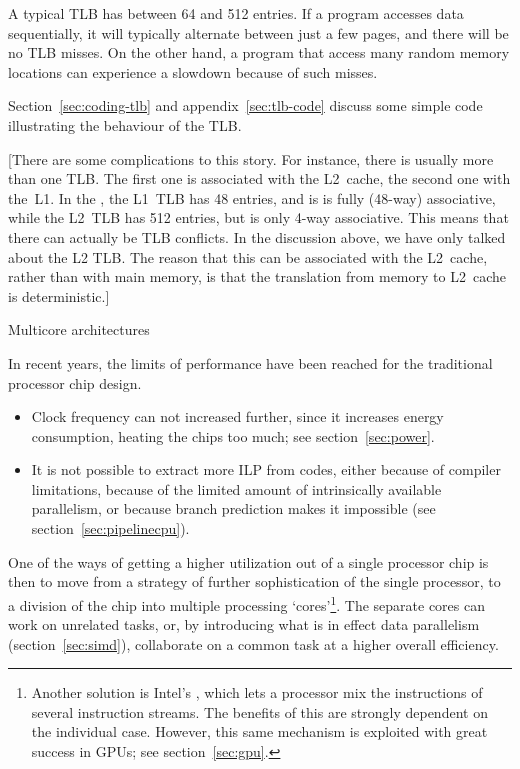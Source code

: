 A typical \ac{TLB} has between 64 and 512 entries. If a program accesses
data sequentially, it will typically alternate between just a few
pages, and there will be no \ac{TLB} misses. On the other hand, a program
that access many random memory locations can experience a slowdown
because of such misses. 

Section~\ref{sec:coding-tlb} and appendix~\ref{sec:tlb-code} discuss
some simple code illustrating the
behaviour of the \ac{TLB}.

[There are some complications to this story. For instance, there is
  usually more than one \ac{TLB}. The first one is associated with the
  L2~cache, the second one with the~L1. In the
  , the L1~\ac{TLB} has 48 entries, and
  is is fully (48-way) associative, while the L2~\ac{TLB} has 512
  entries, but is only 4-way associative. This means that there can
  actually be \ac{TLB} conflicts. In the discussion above, we have
  only talked about the L2 \ac{TLB}. The reason that this can be
  associated with the L2~cache, rather than with main memory, is that
  the translation from memory to L2~cache is deterministic.]

 {Multicore architectures}
\label{sec:multicore}

In recent years, the limits of performance have been reached for the
traditional processor chip design.
\begin{itemize}
\item Clock frequency can not increased further, since it increases
  energy consumption, heating the chips too
  much; see section~\ref{sec:power}. 
\item It is not possible to extract more \acf{ILP}
  from codes, either because of compiler limitations, because of the
  limited amount of intrinsically available parallelism, or because
  branch prediction makes it impossible (see
  section~\ref{sec:pipelinecpu}).
\end{itemize}

One of the ways of getting a higher utilization out of a single
processor chip is then to move from a strategy of further
sophistication of the single processor, to a division of the chip into
multiple processing `cores'\footnote{Another solution is Intel's
  , which lets a processor mix the instructions of
  several instruction streams. The benefits of this are strongly
  dependent on the individual case. However, this same mechanism is
  exploited with great success in GPUs; see
  section~\ref{sec:gpu}.}. The separate cores can work on unrelated
tasks, or, by introducing what is in effect data parallelism
(section~\ref{sec:simd}), collaborate on a common task at a higher
overall efficiency.

